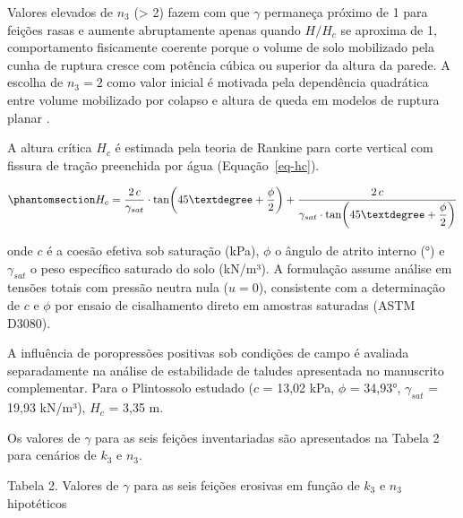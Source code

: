 \documentclass[
  brazilian,
  authoryear,
  preprint]{elsarticle}
\begin{document}
Valores elevados de \(n_3\) (\textgreater{} 2) fazem com que \(\gamma\)
permaneça próximo de 1 para feições rasas e aumente abruptamente apenas
quando \(H/H_c\) se aproxima de 1, comportamento fisicamente coerente
porque o volume de solo mobilizado pela cunha de ruptura cresce com
potência cúbica ou superior da altura da parede. A escolha de
\(n_3 = 2\) como valor inicial é motivada pela dependência quadrática
entre volume mobilizado por colapso e altura de queda em modelos de
ruptura planar \citep{fredlund_rahardjo_1993}.

A altura crítica \(H_c\) é estimada pela teoria de Rankine para corte
vertical com fissura de tração preenchida por água
(Equação~\ref{eq-hc}).

\begin{equation}\phantomsection\label{eq-hc}{
H_c = \dfrac{2\,c}{\gamma_{sat}} \cdot \tan\!\left(45° + \dfrac{\phi}{2}\right) + \dfrac{2\,c}{\gamma_{sat} \cdot \tan\!\left(45° + \dfrac{\phi}{2}\right)}
}\end{equation}

onde \(c\) é a coesão efetiva sob saturação (kPa), \(\phi\) o ângulo de
atrito interno (°) e \(\gamma_{sat}\) o peso específico saturado do solo
(kN/m³). A formulação assume análise em tensões totais com pressão
neutra nula (\(u = 0\)), consistente com a determinação de \(c\) e
\(\phi\) por ensaio de cisalhamento direto em amostras saturadas (ASTM
D3080).

A influência de poropressões positivas sob condições de campo é avaliada
separadamente na análise de estabilidade de taludes apresentada no
manuscrito complementar. Para o Plintossolo estudado (\(c\) = 13,02 kPa,
\(\phi\) = 34,93°, \(\gamma_{sat}\) = 19,93 kN/m³), \(H_c\) = 3,35 m.

Os valores de \(\gamma\) para as seis feições inventariadas são
apresentados na Tabela 2 para cenários de \(k_3\) e \(n_3\).

Tabela 2. Valores de \(\gamma\) para as seis feições erosivas em função
de \(k_3\) e \(n_3\) hipotéticos
\end{document}
